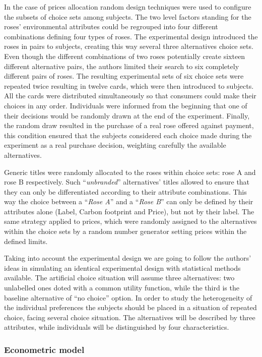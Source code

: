 \documentclass[11pt,]{article}
\begin{document}
In the case of prices allocation random design techniques were used to
configure the subsets of choice sets among subjects. The two level
factors standing for the roses' environmental attributes could be
regrouped into four different combinations defining four types of roses.
The experimental design introduced the roses in pairs to subjects,
creating this way several three alternatives choice sets. Even though
the different combinations of two roses potentially create sixteen
different alternative pairs, the authors limited their search to six
completely different pairs of roses. The resulting experimental sets of
six choice sets were repeated twice resulting in twelve cards, which
were then introduced to subjects. All the cards were distributed
simultaneously so that consumers could make their choices in any order.
Individuals were informed from the beginning that one of their decisions
would be randomly drawn at the end of the experiment. Finally, the
random draw resulted in the purchase of a real rose offered against
payment, this condition ensured that the subjects considered each choice
made during the experiment as a real purchase decision, weighting
carefully the available alternatives.

Generic titles were randomly allocated to the roses within choice sets:
rose A and rose B respectively. Such ``\emph{unbranded}'' alternatives'
titles allowed to ensure that they can only be differentiated according
to their attribute combinations. This way the choice between a
``\emph{Rose A}'' and a ``\emph{Rose B}'' can only be defined by their
attributes alone (Label, Carbon footprint and Price), but not by their
label. The same strategy applied to prices, which were randomly assigned
to the alternatives within the choice sets by a random number generator
setting prices within the defined limits.

Taking into account the experimental design we are going to follow the
authors' ideas in simulating an identical experimental design with
statistical methods available. The artificial choice situation will
assume three alternatives: two unlabelled ones doted with a common
utility function, while the third is the baseline alternative of ``no
choice'' option. In order to study the heterogeneity of the individual
preferences the subjects should be placed in a situation of repeated
choice, facing several choice situation. The alternatives will be
described by three attributes, while individuals will be distinguished
by four characteristics.

\hypertarget{econometric-model}{%
\subsubsection{Econometric model}\label{econometric-model}}
\end{document}
